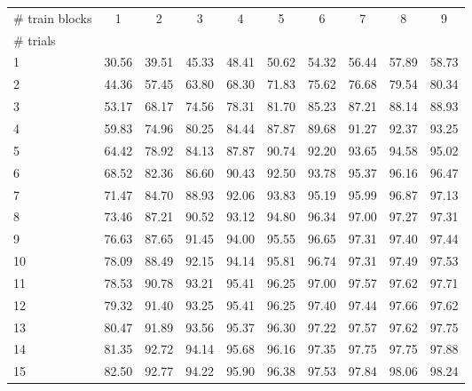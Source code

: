 \begin{tabularx}{\textwidth}{@{}Xccccccccc@{}}
\toprule
\# train blocks & 1 & 2 & 3 & 4 & 5 & 6 & 7 & 8 & 9 \\
\# trials &  &  &  &  &  &  &  &  &  \\
\midrule
1 & 30.56 & 39.51 & 45.33 & 48.41 & 50.62 & 54.32 & 56.44 & 57.89 & 58.73 \\
2 & 44.36 & 57.45 & 63.80 & 68.30 & 71.83 & 75.62 & 76.68 & 79.54 & 80.34 \\
3 & 53.17 & 68.17 & 74.56 & 78.31 & 81.70 & 85.23 & 87.21 & 88.14 & 88.93 \\
4 & 59.83 & 74.96 & 80.25 & 84.44 & 87.87 & 89.68 & 91.27 & 92.37 & 93.25 \\
5 & 64.42 & 78.92 & 84.13 & 87.87 & 90.74 & 92.20 & 93.65 & 94.58 & 95.02 \\
6 & 68.52 & 82.36 & 86.60 & 90.43 & 92.50 & 93.78 & 95.37 & 96.16 & 96.47 \\
7 & 71.47 & 84.70 & 88.93 & 92.06 & 93.83 & 95.19 & 95.99 & 96.87 & 97.13 \\
8 & 73.46 & 87.21 & 90.52 & 93.12 & 94.80 & 96.34 & 97.00 & 97.27 & 97.31 \\
9 & 76.63 & 87.65 & 91.45 & 94.00 & 95.55 & 96.65 & 97.31 & 97.40 & 97.44 \\
10 & 78.09 & 88.49 & 92.15 & 94.14 & 95.81 & 96.74 & 97.31 & 97.49 & 97.53 \\
11 & 78.53 & 90.78 & 93.21 & 95.41 & 96.25 & 97.00 & 97.57 & 97.62 & 97.71 \\
12 & 79.32 & 91.40 & 93.25 & 95.41 & 96.25 & 97.40 & 97.44 & 97.66 & 97.62 \\
13 & 80.47 & 91.89 & 93.56 & 95.37 & 96.30 & 97.22 & 97.57 & 97.62 & 97.75 \\
14 & 81.35 & 92.72 & 94.14 & 95.68 & 96.16 & 97.35 & 97.75 & 97.75 & 97.88 \\
15 & 82.50 & 92.77 & 94.22 & 95.90 & 96.38 & 97.53 & 97.84 & 98.06 & 98.24 \\
\bottomrule
\end{tabularx}
